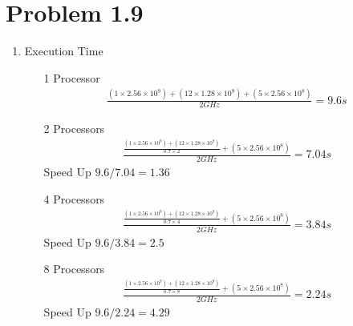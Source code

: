 \documentclass{article}
\def\math#1{$#1$}
\begin{document}
\section{Problem 1.9}
\begin{enumerate}[(1)]
    \item Execution Time
        \begin{itemize}
            \item [1 Processor]
                 \begin{equation}
                    \begin{split}
                       \frac{(1 \times 2.56 \times 10^9) + (12 \times 1.28 \times 10^9) + (5 \times 2.56 \times 10^8)}{2 GHz} = 9.6s
                    \end{split}
                \end{equation}
            \item [2 Processors]
                \begin{equation}
                    \begin{split}
                       \frac{\frac{(1 \times 2.56 \times 10^9) + (12 \times 1.28 \times 10^9)}{0.7 \times 2} + (5 \times 2.56 \times 10^8)}{2 GHz} = 7.04s
                    \end{split}
                \end{equation}
            Speed Up \math{9.6 / 7.04 = 1.36 }
            \item [4 Processors]
                \begin{equation}
                    \begin{split}
                       \frac{\frac{(1 \times 2.56 \times 10^9) + (12 \times 1.28 \times 10^9)}{0.7 \times 4} + (5 \times 2.56 \times 10^8)}{2 GHz} = 3.84s
                    \end{split}
                \end{equation}
              Speed Up \math{9.6 / 3.84 = 2.5}
            \item [8 Processors]
                \begin{equation}
                    \begin{split}
                       \frac{\frac{(1 \times 2.56 \times 10^9) + (12 \times 1.28 \times 10^9)}{0.7 \times 8} + (5 \times 2.56 \times 10^8)}{2 GHz} = 2.24s
                    \end{split}
                \end{equation}
                Speed Up \math{9.6 / 2.24 = 4.29}
        \end{itemize}

\end{enumerate}
\end{document}

